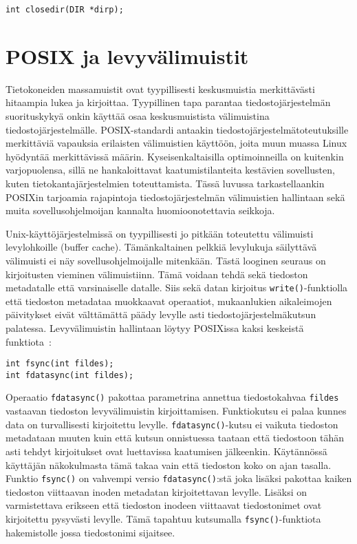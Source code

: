 \begin{verbatim}
int closedir(DIR *dirp);
\end{verbatim}

\section{POSIX ja levyvälimuistit}
\label{ChapPosixDataConsistency}
Tietokoneiden massamuistit ovat tyypillisesti keskusmuistia merkittävästi hitaampia lukea ja kirjoittaa.
Tyypillinen tapa parantaa tiedostojärjestelmän suorituskykyä onkin käyttää osaa keskusmuistista välimuistina tiedostojärjestelmälle.
POSIX-standardi antaakin tiedostojärjestelmätoteutuksille merkittäviä vapauksia erilaisten välimuistien käyttöön,
joita muun muassa Linux hyödyntää merkittävissä määrin.
Kyseisenkaltaisilla optimoinneilla on kuitenkin varjopuolensa,
sillä ne hankaloittavat kaatumistilanteita kestävien sovellusten, kuten tietokantajärjestelmien toteuttamista.
Tässä luvussa tarkastellaankin POSIXin tarjoamia rajapintoja tiedostojärjestelmän välimuistien hallintaan sekä muita sovellusohjelmoijan kannalta huomioonotettavia seikkoja.

Unix-käyttöjärjestelmissä on tyypillisesti jo pitkään toteutettu välimuisti levylohkoille (buffer cache).
Tämänkaltainen pelkkiä levylukuja säilyttävä välimuisti ei näy sovellusohjelmoijalle mitenkään.
Tästä looginen seuraus on kirjoitusten vieminen välimuistiinn.
Tämä voidaan tehdä sekä tiedoston metadatalle että varsinaiselle datalle.
Siis sekä datan kirjoitus \texttt{write()}-funktiolla että
tiedoston metadataa muokkaavat operaatiot,
mukaanlukien aikaleimojen päivitykset eivät välttämättä päädy levylle asti tiedostojärjestelmäkutsun palatessa.
Levyvälimuistin hallintaan löytyy POSIXissa kaksi keskeistä funktiota~\cite{PosixSpec}:

\begin{verbatim}
int fsync(int fildes);
int fdatasync(int fildes);
\end{verbatim}

Operaatio \texttt{fdatasync()} pakottaa parametrina annettua tiedostokahvaa \texttt{fildes} vastaavan tiedoston levyvälimuistin kirjoittamisen.
Funktiokutsu ei palaa kunnes data on turvallisesti kirjoitettu levylle.
\texttt{fdatasync()}-kutsu ei vaikuta tiedoston metadataan muuten kuin että kutsun onnistuessa taataan että tiedostoon tähän asti tehdyt kirjoitukset ovat luettavissa kaatumisen jälkeenkin.
Käytännössä käyttäjän näkokulmasta tämä takaa vain että tiedoston koko on ajan tasalla.
Funktio \texttt{fsync()} on vahvempi versio \texttt{fdatasync()}:stä joka lisäksi pakottaa kaiken tiedoston viittaavan inoden metadatan kirjoitettavan levylle.
Lisäksi on varmistettava erikseen että tiedoston inodeen viittaavat tiedostonimet ovat kirjoitettu pysyvästi levylle.
Tämä tapahtuu kutsumalla \texttt{fsync()}-funktiota hakemistolle jossa tiedostonimi sijaitsee.

